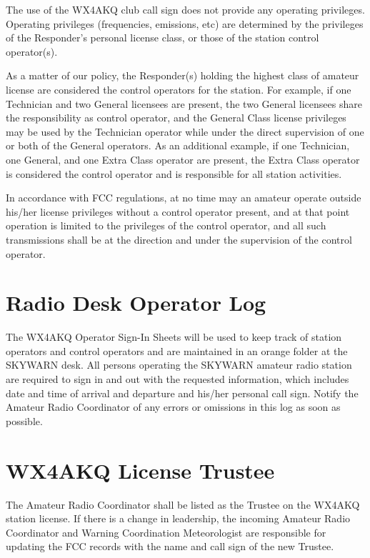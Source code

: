 \documentclass[pdflatex,letterpaper,twoside,12pt]{book}
\begin{document}
The use of the WX4AKQ club call sign does not provide any operating privileges.  Operating privileges (frequencies, emissions, etc) are determined by the privileges of the Responder's personal license class, or those of the station control operator(s). 

As a matter of our policy, the Responder(s) holding the highest class of amateur license are considered the control operators for the station.  For example, if one Technician and two General licensees are present, the two General licensees share the responsibility as control operator, and the General Class license privileges may be used by the Technician operator while under the direct supervision of one or both of the General operators.  As an additional example, if one Technician, one General, and one Extra Class operator are present, the Extra Class operator is considered the control operator and is responsible for all station activities. 

In accordance with FCC regulations, at no time may an amateur operate outside his/her license privileges without a control operator present, and at that point operation is limited to the privileges of the control operator, and all such transmissions shall be at the direction and under the supervision of the control operator.


\section{Radio Desk Operator Log}

The WX4AKQ Operator Sign-In Sheets will be used to keep track of station operators and control operators and are maintained in an orange folder at the SKYWARN desk.  All persons operating the SKYWARN amateur radio station are required to sign in and out with the requested information, which includes date and time of arrival and departure and his/her personal call sign.  Notify the Amateur Radio Coordinator of any errors or omissions in this log as soon as possible.


\section{WX4AKQ License Trustee}
The Amateur Radio Coordinator shall be listed as the Trustee on the WX4AKQ station license.  If there is a change in leadership, the incoming Amateur Radio Coordinator and Warning Coordination Meteorologist are responsible for updating the FCC records with the name and call sign of the new Trustee.
\end{document}
